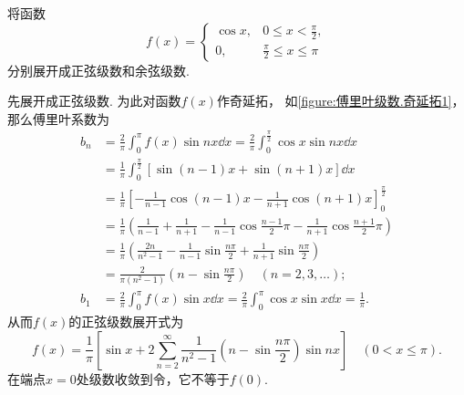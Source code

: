 \begin{example}
将函数\[
	f(x) = \left\{ \begin{array}{cc}
		\cos x, & 0 \leq x < \frac{\pi}{2}, \\
		0, & \frac{\pi}{2} \leq x \leq \pi
	\end{array} \right.
\]分别展开成正弦级数和余弦级数.
\begin{solution}
先展开成正弦级数.
为此对函数\(f(x)\)作奇延拓，
如\cref{figure:傅里叶级数.奇延拓1}，
那么傅里叶系数为\begin{align*}
	b_n &= \frac{2}{\pi} \int_0^\pi f(x) \sin nx \dd{x}
	= \frac{2}{\pi}
		\int_0^{\frac{\pi}{2}} \cos x \sin nx \dd{x} \\
	&= \frac{1}{\pi}
		\int_0^{\frac{\pi}{2}} [\sin(n-1)x + \sin(n+1)x] \dd{x} \\
	&= \frac{1}{\pi}
		\left[
			-\frac{1}{n-1} \cos(n-1)x - \frac{1}{n+1} \cos(n+1)x
		\right]_0^{\frac{\pi}{2}} \\
	&= \frac{1}{\pi}
		\left(
			\frac{1}{n-1}
			+ \frac{1}{n+1}
			- \frac{1}{n-1} \cos\frac{n-1}{2}\pi
			- \frac{1}{n+1} \cos\frac{n+1}{2}\pi
		\right) \\
	&= \frac{1}{\pi}
		\left(
			\frac{2n}{n^2-1}
			- \frac{1}{n-1}
			\sin\frac{n\pi}{2}
			+ \frac{1}{n+1}\sin\frac{n\pi}{2}
		\right) \\
	&= \frac{2}{\pi(n^2-1)} \left(n-\sin\frac{n\pi}{2}\right)
		\quad(n=2,3,\dotsc); \\
	b_1 &= \frac{2}{\pi} \int_0^\pi f(x) \sin x \dd{x}
	= \frac{2}{\pi} \int_0^\pi \cos x \sin x \dd{x} = \frac{1}{\pi}.
\end{align*}
从而\(f(x)\)的正弦级数展开式为\[
f(x) = \frac{1}{\pi} \left[
		\sin x
		+ 2\sum\limits_{n=2}^\infty
			\frac{1}{n^2-1} \left(n-\sin\frac{n\pi}{2}\right) \sin nx
	\right]
	\quad(0 < x \leq \pi).
\]
在端点\(x=0\)处级数收敛到令，它不等于\(f(0)\).


\end{solution}
\end{example}

